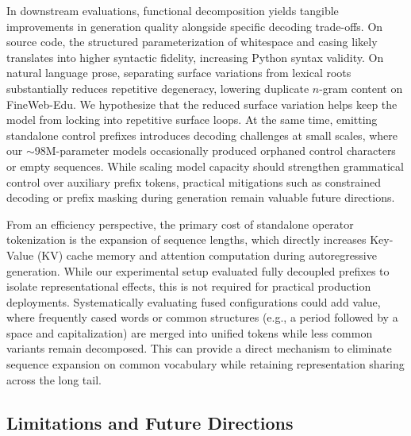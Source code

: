 \documentclass{article}
\begin{document}
In downstream evaluations, functional decomposition yields tangible improvements in generation quality alongside specific decoding trade-offs. On source code, the structured parameterization of whitespace and casing likely translates into higher syntactic fidelity, increasing Python syntax validity. On natural language prose, separating surface variations from lexical roots substantially reduces repetitive degeneracy, lowering duplicate $n$-gram content on FineWeb-Edu. We hypothesize that the reduced surface variation helps keep the model from locking into repetitive surface loops. At the same time, emitting standalone control prefixes introduces decoding challenges at small scales, where our $\sim$98M-parameter models occasionally produced orphaned control characters or empty sequences. While scaling model capacity should strengthen grammatical control over auxiliary prefix tokens, practical mitigations such as constrained decoding or prefix masking during generation remain valuable future directions.

From an efficiency perspective, the primary cost of standalone operator tokenization is the expansion of sequence lengths, which directly increases Key-Value (KV) cache memory and attention computation during autoregressive generation. While our experimental setup evaluated fully decoupled prefixes to isolate representational effects, this is not required for practical production deployments. Systematically evaluating fused configurations could add value, where frequently cased words or common structures (e.g., a period followed by a space and capitalization) are merged into unified tokens while less common variants remain decomposed. This can provide a direct mechanism to eliminate sequence expansion on common vocabulary while retaining representation sharing across the long tail.

\subsection{Limitations and Future Directions}
\label{sec:limitations_future_work}
\end{document}
